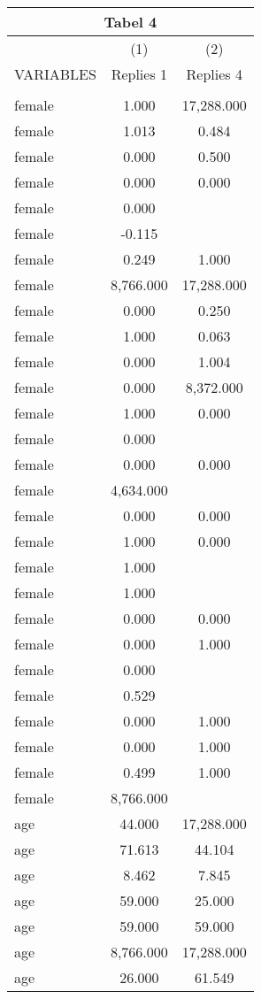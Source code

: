 \documentclass[]{article}
\begin{document}
\begin{tabular}{lcc}
\multicolumn{3}{c}{Tabel 4} \\ \hline
 & (1) & (2) \\
VARIABLES & Replies 1 & Replies 4 \\ \hline
 &  &  \\
female & 1.000 & 17,288.000 \\
female & 1.013 & 0.484 \\
female & 0.000 & 0.500 \\
female & 0.000 & 0.000 \\
female & 0.000 &  \\
female & -0.115 &  \\
female & 0.249 & 1.000 \\
female & 8,766.000 & 17,288.000 \\
female & 0.000 & 0.250 \\
female & 1.000 & 0.063 \\
female & 0.000 & 1.004 \\
female & 0.000 & 8,372.000 \\
female & 1.000 & 0.000 \\
female & 0.000 &  \\
female & 0.000 & 0.000 \\
female & 4,634.000 &  \\
female & 0.000 & 0.000 \\
female & 1.000 & 0.000 \\
female & 1.000 &  \\
female & 1.000 &  \\
female & 0.000 & 0.000 \\
female & 0.000 & 1.000 \\
female & 0.000 &  \\
female & 0.529 &  \\
female & 0.000 & 1.000 \\
female & 0.000 & 1.000 \\
female & 0.499 & 1.000 \\
female & 8,766.000 &  \\
age & 44.000 & 17,288.000 \\
age & 71.613 & 44.104 \\
age & 8.462 & 7.845 \\
age & 59.000 & 25.000 \\
age & 59.000 & 59.000 \\
age & 8,766.000 & 17,288.000 \\
age & 26.000 & 61.549 \\

\end{tabular}
\end{document}
